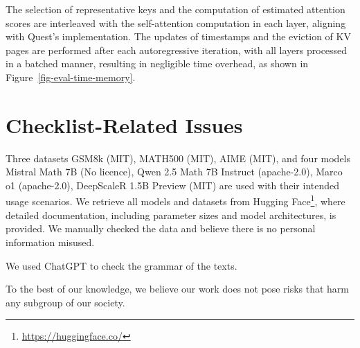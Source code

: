 The selection of representative keys and the computation of estimated attention scores are interleaved with the self-attention computation in each layer, aligning with Quest's implementation. The updates of timestamps and the eviction of KV pages are performed after each autoregressive iteration, with all layers processed in a batched manner, resulting in negligible time overhead, as shown in Figure~\ref{fig-eval-time-memory}.

\section{Checklist-Related Issues}

Three datasets GSM8k (MIT), MATH500 (MIT), AIME (MIT), and four models Mistral Math 7B (No licence), Qwen 2.5 Math 7B Instruct (apache-2.0), Marco o1 (apache-2.0), DeepScaleR 1.5B Preview  (MIT) are used with their intended usage scenarios. We retrieve all models and datasets from Hugging Face\footnote{\url{https://huggingface.co/}}, where detailed documentation, including parameter sizes and model architectures, is provided. We manually checked the data and believe there is no personal information misused.

We used ChatGPT to check the grammar of the texts.

To the best of our knowledge, we believe our work does not pose risks that harm any subgroup of our society. 


